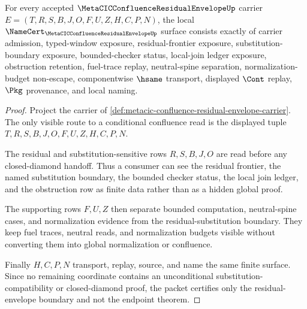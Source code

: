 \begin{theorem}
\label{thm:metacic-confluence-residual-envelope-namecert-surface}
For every accepted $\MetaCICConfluenceResidualEnvelopeUp$ carrier $E=(T,R,S,B,J,O,F,U,Z,H,C,P,N)$, the local $\NameCert_{\MetaCICConfluenceResidualEnvelopeUp}$ surface consists exactly of carrier admission, typed-window exposure, residual-frontier exposure, substitution-boundary exposure, bounded-checker status, local-join ledger exposure, obstruction retention, fuel-trace replay, neutral-spine separation, normalization-budget non-escape, componentwise $\hsame$ transport, displayed $\Cont$ replay, $\Pkg$ provenance, and local naming.
\end{theorem}
\begin{proof}
Project the carrier of \autoref{def:metacic-confluence-residual-envelope-carrier}. The only visible route to a conditional confluence read is the displayed tuple $T,R,S,B,J,O,F,U,Z,H,C,P,N$.

The residual and substitution-sensitive rows $R,S,B,J,O$ are read before any closed-diamond handoff. Thus a consumer can see the residual frontier, the named substitution boundary, the bounded checker status, the local join ledger, and the obstruction row as finite data rather than as a hidden global proof.

The supporting rows $F,U,Z$ then separate bounded computation, neutral-spine cases, and normalization evidence from the residual-substitution boundary. They keep fuel traces, neutral reads, and normalization budgets visible without converting them into global normalization or confluence.

Finally $H,C,P,N$ transport, replay, source, and name the same finite surface. Since no remaining coordinate contains an unconditional substitution-compatibility or closed-diamond proof, the packet certifies only the residual-envelope boundary and not the endpoint theorem.
\end{proof}

